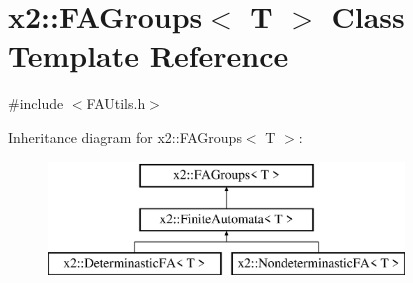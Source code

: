 \hypertarget{classx2_1_1_f_a_groups}{}\section{x2\+:\+:F\+A\+Groups$<$ T $>$ Class Template Reference}
\label{classx2_1_1_f_a_groups}


{\ttfamily \#include $<$F\+A\+Utils.\+h$>$}

Inheritance diagram for x2\+:\+:F\+A\+Groups$<$ T $>$\+:\begin{figure}[H]
\begin{center}
\leavevmode
\includegraphics[height=3.000000cm]{classx2_1_1_f_a_groups}
\end{center}
\end{figure}
